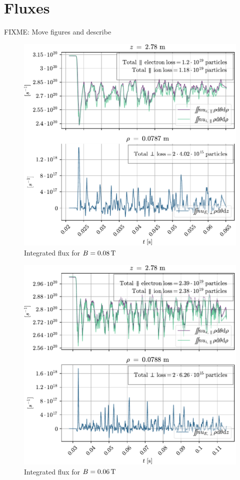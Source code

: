 \section{Fluxes}
FIXME: Move figures and describe
%
\begin{figure}[htb]
    \centering
    \includegraphics{fig/results/totalFlux/flux0008}
    \caption{Integrated flux for $B=0.08\, \text{T}$}
    \label{fig:flux0008}
\end{figure}
%
\begin{figure}[htb]
    \centering
    \includegraphics{fig/results/totalFlux/flux0006}
    \caption{Integrated flux for $B=0.06\, \text{T}$}
    \label{fig:flux0006}
\end{figure}
